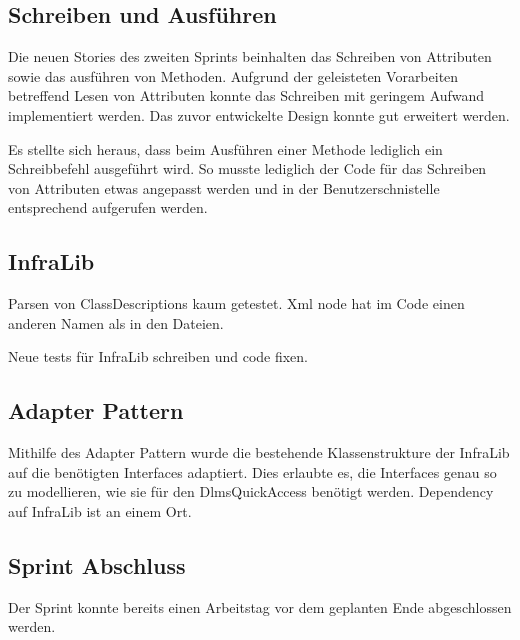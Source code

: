 \subsection{Schreiben und Ausführen}
Die neuen Stories des zweiten Sprints beinhalten das Schreiben von Attributen sowie das ausführen von Methoden.
Aufgrund der geleisteten Vorarbeiten betreffend Lesen von Attributen konnte das Schreiben mit geringem Aufwand implementiert werden.
Das zuvor entwickelte Design konnte gut erweitert werden.

Es stellte sich heraus, dass beim Ausführen einer Methode lediglich ein Schreibbefehl ausgeführt wird.
So musste lediglich der Code für das Schreiben von Attributen etwas angepasst werden und in der Benutzerschnistelle entsprechend aufgerufen werden.



\subsection{InfraLib}
Parsen von ClassDescriptions kaum getestet. Xml node hat im Code einen anderen Namen als in den Dateien.

Neue tests für InfraLib schreiben und code fixen.

\subsection{Adapter Pattern}

Mithilfe des Adapter Pattern wurde die bestehende Klassenstrukture der InfraLib auf die benötigten Interfaces adaptiert.
Dies erlaubte es, die Interfaces genau so zu modellieren, wie sie für den DlmsQuickAccess benötigt werden.
Dependency auf InfraLib ist an einem Ort.


\subsection{Sprint Abschluss}
Der Sprint konnte bereits einen Arbeitstag vor dem geplanten Ende abgeschlossen werden.